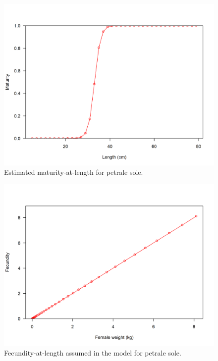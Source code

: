 \documentclass[12pt,]{article}
\begin{document}
\FloatBarrier

\begin{figure}
\centering
\includegraphics{r4ss/plots_mod1/bio6_maturity.png}
\caption{Estimated maturity-at-length for petrale sole.
\label{fig:maturity}}
\end{figure}

\FloatBarrier

\begin{figure}
\centering
\includegraphics{r4ss/plots_mod1/bio8_fecundity_wt.png}
\caption{Fecundity-at-length assumed in the model for petrale sole.
\label{fig:fecundity_model}}
\end{figure}
\end{document}
